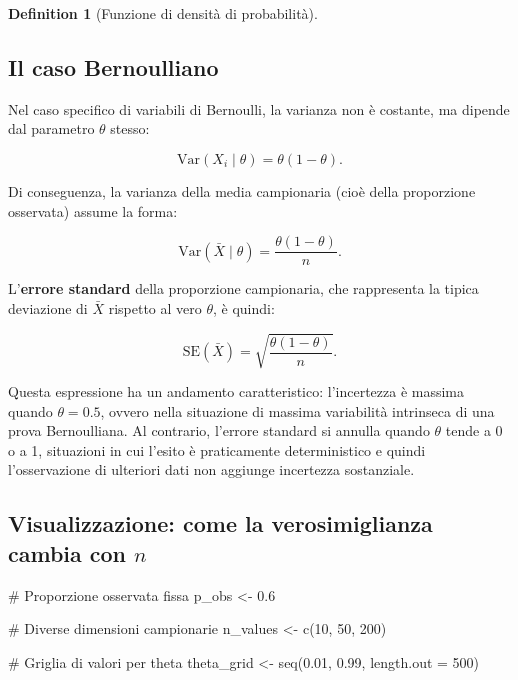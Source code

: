 \documentclass[
  letterpaper,
  DIV=11,
  numbers=noendperiod,
  oneside]{scrreprt}
\newenvironment{Shaded}{\begin{snugshade}}{\end{snugshade}}
\newcommand{\AttributeTok}[1]{\textcolor[rgb]{0.40,0.45,0.13}{#1}}
\newcommand{\CommentTok}[1]{\textcolor[rgb]{0.37,0.37,0.37}{#1}}
\newcommand{\DecValTok}[1]{\textcolor[rgb]{0.68,0.00,0.00}{#1}}
\newcommand{\FloatTok}[1]{\textcolor[rgb]{0.68,0.00,0.00}{#1}}
\newcommand{\FunctionTok}[1]{\textcolor[rgb]{0.28,0.35,0.67}{#1}}
\newcommand{\NormalTok}[1]{\textcolor[rgb]{0.00,0.23,0.31}{#1}}
\newcommand{\OtherTok}[1]{\textcolor[rgb]{0.00,0.23,0.31}{#1}}
\theoremstyle{definition}
\theoremstyle{plain}
\theoremstyle{definition}
\newtheorem{definition}{Definition}[chapter]
\theoremstyle{remark}
\begin{document}
\begin{definition}[Funzione di densità di
probabilità]
\subsection{Il caso Bernoulliano}\label{il-caso-bernoulliano}

Nel caso specifico di variabili di Bernoulli, la varianza non è
costante, ma dipende dal parametro \(\theta\) stesso:

\[
\text{Var}(X_i \mid \theta) = \theta(1-\theta).
\]

Di conseguenza, la varianza della media campionaria (cioè della
proporzione osservata) assume la forma:

\[
\text{Var}(\bar{X} \mid \theta) = \frac{\theta(1-\theta)}{n}.
\]

L'\textbf{errore standard} della proporzione campionaria, che
rappresenta la tipica deviazione di \(\bar{X}\) rispetto al vero
\(\theta\), è quindi:

\[
\text{SE}(\bar{X}) = \sqrt{\frac{\theta(1-\theta)}{n}}.
\]

Questa espressione ha un andamento caratteristico: l'incertezza è
massima quando \(\theta = 0.5\), ovvero nella situazione di massima
variabilità intrinseca di una prova Bernoulliana. Al contrario, l'errore
standard si annulla quando \(\theta\) tende a 0 o a 1, situazioni in cui
l'esito è praticamente deterministico e quindi l'osservazione di
ulteriori dati non aggiunge incertezza sostanziale.

\subsection{\texorpdfstring{Visualizzazione: come la verosimiglianza
cambia con
\(n\)}{Visualizzazione: come la verosimiglianza cambia con n}}\label{visualizzazione-come-la-verosimiglianza-cambia-con-n}

\begin{Shaded}
\begin{Highlighting}[]
\CommentTok{\# Proporzione osservata fissa}
\NormalTok{p\_obs }\OtherTok{\textless{}{-}} \FloatTok{0.6}

\CommentTok{\# Diverse dimensioni campionarie}
\NormalTok{n\_values }\OtherTok{\textless{}{-}} \FunctionTok{c}\NormalTok{(}\DecValTok{10}\NormalTok{, }\DecValTok{50}\NormalTok{, }\DecValTok{200}\NormalTok{)}

\CommentTok{\# Griglia di valori per theta}
\NormalTok{theta\_grid }\OtherTok{\textless{}{-}} \FunctionTok{seq}\NormalTok{(}\FloatTok{0.01}\NormalTok{, }\FloatTok{0.99}\NormalTok{, }\AttributeTok{length.out =} \DecValTok{500}\NormalTok{)}


\end{Highlighting}
\end{Shaded}
\end{definition}
\end{document}
